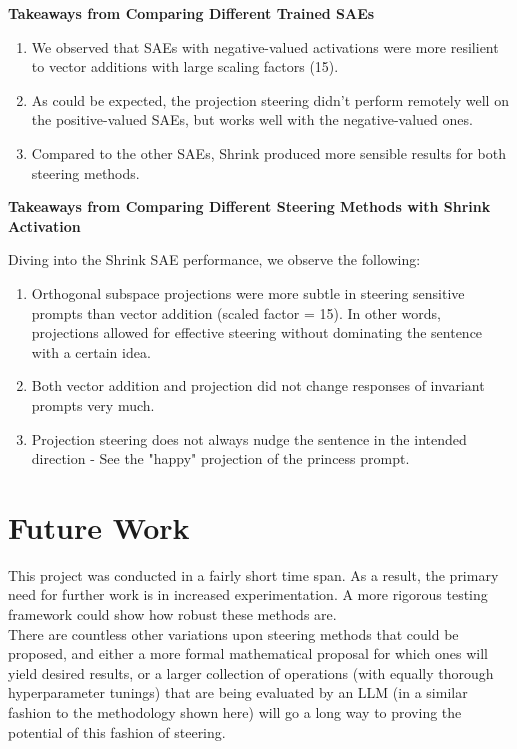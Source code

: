 \documentclass{article}
\begin{document}
\begin{center}
    \textbf{Takeaways from Comparing Different Trained SAEs}
\end{center}
    \begin{enumerate}
        \item We observed that SAEs with negative-valued activations were more resilient to vector additions with large scaling factors (15).
        \item As could be expected, the projection steering didn't perform remotely well on the positive-valued SAEs, but works well with the negative-valued ones.
        \item Compared to the other SAEs, Shrink produced more sensible results for both steering methods.
    \end{enumerate}
\begin{center}
    \textbf{Takeaways from Comparing Different Steering Methods with Shrink Activation }
\end{center}
    Diving into the Shrink SAE performance, we observe the following:
    \begin{enumerate}
        \item Orthogonal subspace projections were more subtle in steering sensitive prompts than vector addition (scaled factor = 15). In other words, projections allowed for effective steering without dominating the sentence with a certain idea.
        \item Both vector addition and projection did not change responses of invariant prompts very much.
        \item Projection steering does not always nudge the sentence in the intended direction - See the "happy" projection of the princess prompt.
    \end{enumerate}


\section{Future Work}

This project was conducted in a fairly short time span. As a result, the primary need for further work is in increased experimentation. A more rigorous testing framework could show how robust these methods are.\\

There are countless other variations upon steering methods that could be proposed, and either a more formal mathematical proposal for which ones will yield desired results, or a larger collection of operations (with equally thorough hyperparameter tunings) that are being evaluated by an LLM (in a similar fashion to the methodology shown here) will go a long way to proving the potential of this fashion of steering.\\
\end{document}
